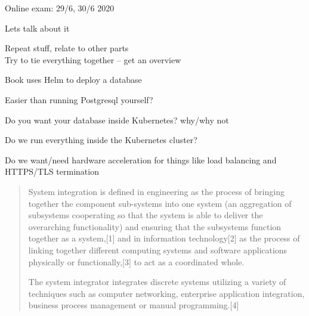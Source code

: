 \documentclass[Screen16to9,17pt]{foils}
\begin{document}

Online exam: 29/6, 30/6 2020

Lets talk about it

Repeat stuff, relate to other parts\\
Try to tie everything together -- get an overview




\begin{quote}

\end{quote}

\begin{list2}
  \item Book uses Helm to deploy a database
  \item Easier than running Postgresql yourself?
  \item Do you want your database inside Kubernetes? why/why not
\end{list2}



\begin{quote}

\end{quote}

\begin{list2}
  \item Do we run everything inside the Kubernetes cluster?
  \item Do we want/need hardware acceleration for things like load balancing and HTTPS/TLS termination
\end{list2}




\begin{quote}
  System integration is defined in engineering as the process of bringing together the component sub-systems into one system (an aggregation of subsystems cooperating so that the system is able to deliver the overarching functionality) and ensuring that the subsystems function together as a system,[1] and in information technology[2] as the process of linking together different computing systems and software applications physically or functionally,[3] to act as a coordinated whole.

  The system integrator integrates discrete systems utilizing a variety of techniques such as computer networking, enterprise application integration, business process management or manual programming.[4]
\end{quote}
\end{document}
